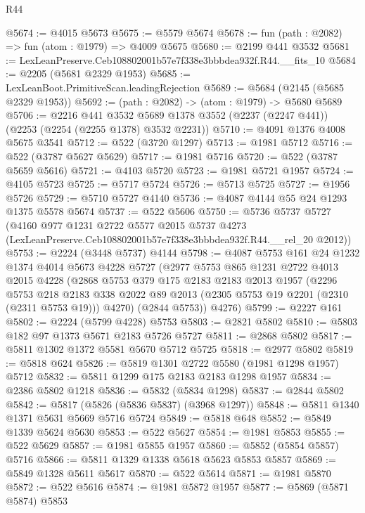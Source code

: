 \begin{lexlean}{R44}
\begin{coremodule}
@5674 := @4015 @5673
@5675 := @5579 @5674
@5678 := fun (path : @2082) => fun (atom : @1979) => @4009 @5675
@5680 := @2199 @441 @3532
@5681 := LexLeanPreserve.Ceb108802001b57e7f338e3bbbdea932f.R44.__fits_10
@5684 := @2205 (@5681 @2329 @1953)
@5685 := LexLeanBoot.PrimitiveScan.leadingRejection
@5689 := @5684 (@2145 (@5685 @2329 @1953))
@5692 := (path : @2082) -> (atom : @1979) -> @5680 @5689
@5706 := @2216
    @441
    @3532
    @5689
    @1378
    @3552
    (@2237 (@2247 @441))
    (@2253 (@2254 (@2255 @1378) @3532 @2231))
@5710 := @4091 @1376 @4008 @5675 @3541
@5712 := @522 (@3720 @1297)
@5713 := @1981 @5712
@5716 := @522 (@3787 @5627 @5629)
@5717 := @1981 @5716
@5720 := @522 (@3787 @5659 @5616)
@5721 := @4103 @5720
@5723 := @1981 @5721 @1957
@5724 := @4105 @5723
@5725 := @5717 @5724
@5726 := @5713 @5725
@5727 := @1956 @5726
@5729 := @5710 @5727 @4140
@5736 := @4087 @4144 @55 @24 @1293 @1375 @5578 @5674
@5737 := @522 @5606
@5750 := @5736
    @5737
    @5727
    (@4160
      @977
      @1231
      @2722
      @5577
      @2015
      @5737
      @4273
      (LexLeanPreserve.Ceb108802001b57e7f338e3bbbdea932f.R44.__rel_20 @2012))
@5753 := @2224 (@3448 @5737) @4144
@5798 := @4087
    @5753
    @161
    @24
    @1232
    @1374
    @4014
    @5673
    @4228
    @5727
    (@2977
      @5753
      @865
      @1231
      @2722
      @4013
      @2015
      @4228
      (@2868
        @5753
        @379
        @175
        @2183
        @2183
        @2013
        @1957
        (@2296
          @5753
          @218
          @2183
          @338
          @2022
          @89
          @2013
          (@2305 @5753 @19 @2201 (@2310 (@2311 @5753 @19)))
          @4270)
        (@2844 @5753))
      @4276)
@5799 := @2227 @161
@5802 := @2224 (@5799 @4228) @5753
@5803 := @2821 @5802
@5810 := @5803 @182 @97 @1373 @5671 @2183 @5726 @5727
@5811 := @2868 @5802
@5817 := @5811 @1302 @1372 @5581 @5670 @5712 @5725
@5818 := @2977 @5802
@5819 := @5818 @624
@5826 := @5819 @1301 @2722 @5580 (@1981 @1298 @1957) @5712
@5832 := @5811 @1299 @175 @2183 @2183 @1298 @1957
@5834 := @2386 @5802 @1218
@5836 := @5832 (@5834 @1298)
@5837 := @2844 @5802
@5842 := @5817 (@5826 (@5836 @5837) (@3968 @1297))
@5848 := @5811 @1340 @1371 @5631 @5669 @5716 @5724
@5849 := @5818 @648
@5852 := @5849 @1339 @5624 @5630
@5853 := @522 @5627
@5854 := @1981 @5853
@5855 := @522 @5629
@5857 := @1981 @5855 @1957
@5860 := @5852 (@5854 @5857) @5716
@5866 := @5811 @1329 @1338 @5618 @5623 @5853 @5857
@5869 := @5849 @1328 @5611 @5617
@5870 := @522 @5614
@5871 := @1981 @5870
@5872 := @522 @5616
@5874 := @1981 @5872 @1957
@5877 := @5869 (@5871 @5874) @5853

\end{coremodule}
\end{lexlean}
